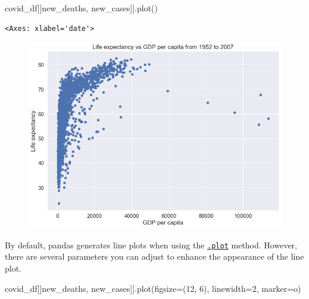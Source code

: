 \documentclass[
  letterpaper,
  DIV=11,
  numbers=noendperiod]{scrreprt}
\newenvironment{Shaded}{\begin{snugshade}}{\end{snugshade}}
\newcommand{\DecValTok}[1]{\textcolor[rgb]{0.68,0.00,0.00}{#1}}
\newcommand{\NormalTok}[1]{\textcolor[rgb]{0.00,0.23,0.31}{#1}}
\newcommand{\OperatorTok}[1]{\textcolor[rgb]{0.37,0.37,0.37}{#1}}
\newcommand{\StringTok}[1]{\textcolor[rgb]{0.13,0.47,0.30}{#1}}
\begin{document}
\begin{Shaded}
\begin{Highlighting}[]
\NormalTok{covid\_df[[}\StringTok{\textquotesingle{}new\_deaths\textquotesingle{}}\NormalTok{, }\StringTok{\textquotesingle{}new\_cases\textquotesingle{}}\NormalTok{]].plot()}
\end{Highlighting}
\end{Shaded}

\begin{verbatim}
<Axes: xlabel='date'>
\end{verbatim}

\begin{figure}[H]

{\centering \includegraphics{Data visualization_files/figure-pdf/cell-8-output-2.png}

}

\end{figure}

By default, pandas generates line plots when using the
\href{https://pandas.pydata.org/docs/reference/api/pandas.DataFrame.plot.html}{\texttt{.plot}}
method. However, there are several parameters you can adjust to enhance
the appearance of the line plot.

\begin{Shaded}
\begin{Highlighting}[]
\NormalTok{covid\_df[[}\StringTok{\textquotesingle{}new\_deaths\textquotesingle{}}\NormalTok{, }\StringTok{\textquotesingle{}new\_cases\textquotesingle{}}\NormalTok{]].plot(figsize}\OperatorTok{=}\NormalTok{(}\DecValTok{12}\NormalTok{, }\DecValTok{6}\NormalTok{), linewidth}\OperatorTok{=}\DecValTok{2}\NormalTok{, marker}\OperatorTok{=}\StringTok{\textquotesingle{}o\textquotesingle{}}\NormalTok{)}
\end{Highlighting}
\end{Shaded}
\end{document}
